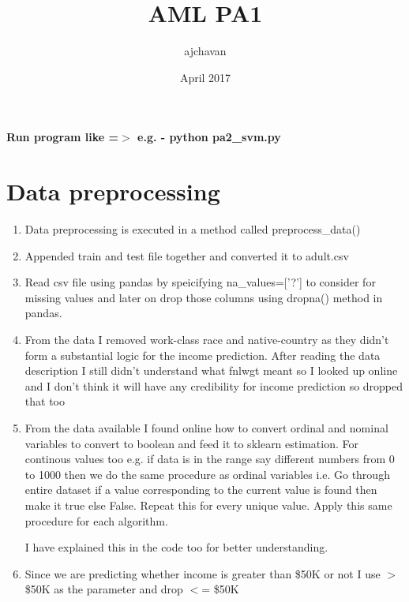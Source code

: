 \documentclass{article}
\title{AML PA1}
\author{ajchavan }
\date{April 2017}
\begin{document}
\maketitle


\begin{center}
\textbf{Run program like =$>$ e.g. - python pa2\_svm.py}
\end{center}

\pagebreak

\section{Data preprocessing}

\begin{enumerate}
    \item Data preprocessing is executed in a method called preprocess\_data()
    \item Appended train and test file together and converted it to adult.csv
    \item Read csv file using pandas by speicifying na\_values=['?'] to consider for missing values and later on drop those columns using dropna() method in pandas.
    \item From the data I removed work-class race and native-country as they didn't form a substantial logic for the income prediction. After reading the data description I still didn't understand what fnlwgt meant so I looked up online and I don't think it will have any credibility for income prediction so dropped that too
    \item From the data available I found online how to convert ordinal and nominal variables to convert to boolean and feed it to sklearn estimation. For continous values too e.g. if data is in the range say different numbers from 0 to 1000 then we do the same procedure as ordinal variables  i.e. Go through entire dataset if a value corresponding to the current value is found then make it true else False. Repeat this for every unique value. Apply this same procedure for each algorithm. 
    
    I have explained this in the code too for better understanding.
    
    
    \item Since we are predicting whether income is greater than \$50K or not I use $>$ \$50K as the parameter and drop $<$= \$50K
    
\end{enumerate}

\pagebreak
\end{document}
